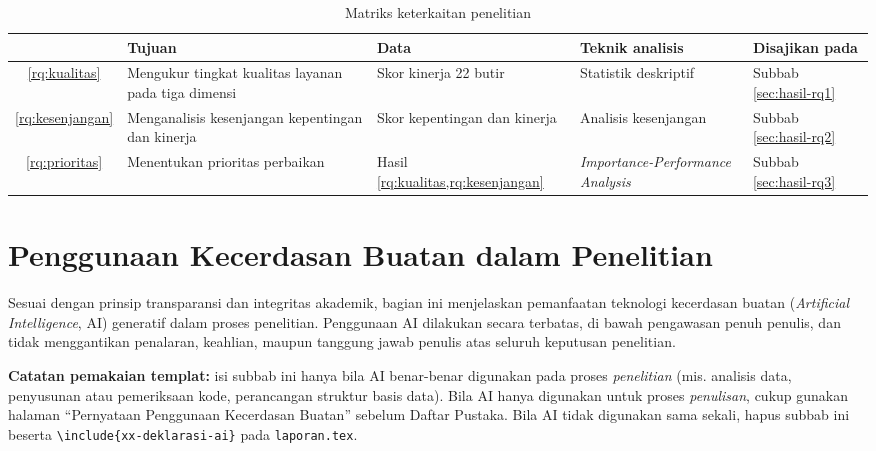 \begin{table}[H]
    \centering
    \caption{Matriks keterkaitan penelitian}
    \label{tab:keterkaitan}
    \footnotesize
    \setlength{\tabcolsep}{4pt}
    \begin{tabular}{|c|p{2.9cm}|p{2.4cm}|p{3.3cm}|p{2.4cm}|}
        \hline
        \textbf{} & \textbf{Tujuan} & \textbf{Data} &
        \textbf{Teknik analisis} & \textbf{Disajikan pada} \\ \hline

        \cref{rq:kualitas} & Mengukur tingkat kualitas layanan pada tiga dimensi &
        Skor kinerja 22 butir & Statistik deskriptif &
        Subbab \ref{sec:hasil-rq1} \\ \hline

        \cref{rq:kesenjangan} & Menganalisis kesenjangan kepentingan dan kinerja &
        Skor kepentingan dan kinerja & Analisis kesenjangan &
        Subbab \ref{sec:hasil-rq2} \\ \hline

        \cref{rq:prioritas} & Menentukan prioritas perbaikan &
        Hasil \cref{rq:kualitas,rq:kesenjangan} & \textit{Importance-\newline Performance Analysis} &
        Subbab \ref{sec:hasil-rq3} \\ \hline
    \end{tabular}
\end{table}

\section{Penggunaan Kecerdasan Buatan dalam Penelitian}
\label{sec:ai-penelitian}

Sesuai dengan prinsip transparansi dan integritas akademik, bagian ini
menjelaskan pemanfaatan teknologi kecerdasan buatan (\textit{Artificial
Intelligence}, AI) generatif dalam proses penelitian. Penggunaan AI dilakukan
secara terbatas, di bawah pengawasan penuh penulis, dan tidak menggantikan
penalaran, keahlian, maupun tanggung jawab penulis atas seluruh keputusan
penelitian.

\noindent\textbf{Catatan pemakaian templat:} isi subbab ini hanya bila AI benar-benar
digunakan pada proses \emph{penelitian} (mis. analisis data, penyusunan atau
pemeriksaan kode, perancangan struktur basis data). Bila AI hanya digunakan untuk
proses \emph{penulisan}, cukup gunakan halaman ``Pernyataan Penggunaan Kecerdasan
Buatan'' sebelum Daftar Pustaka. Bila AI tidak digunakan sama sekali, hapus subbab
ini beserta \texttt{\textbackslash include\{xx-deklarasi-ai\}} pada
\texttt{laporan.tex}.

